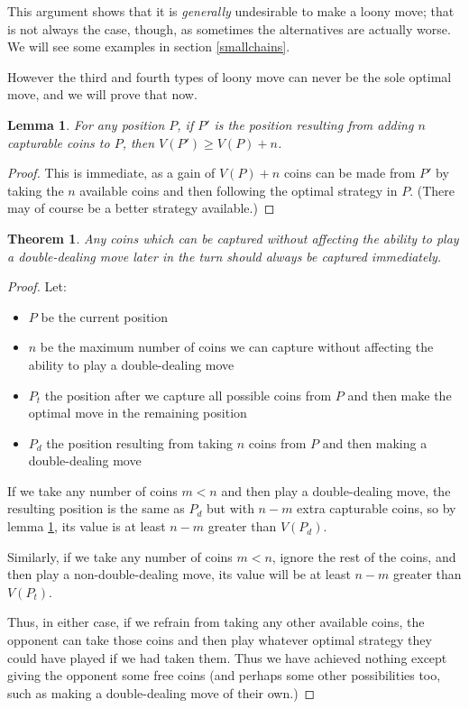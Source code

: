 \documentclass[a4paper,twocolumn]{article}
\newtheorem{addcoins}[thm]{Lemma}
\newtheorem{freecoins}[thm]{Theorem}
\begin{document}
This argument shows that it is \emph{generally} undesirable to make a
loony move; that is not always the case, though, as sometimes the
alternatives are actually worse. We will see some examples in section
\ref{smallchains}.

However the third and fourth types of loony move can never be the sole
optimal move, and we will prove that now.

\begin{addcoins}\label{addcoins}
  For any position $P$, if $P'$ is the position resulting from adding
  $n$ capturable coins to $P$, then $V(P') \ge V(P)+n$.
\end{addcoins}
\begin{proof}
  This is immediate, as a gain of $V(P)+n$ coins can be made from $P'$
  by taking the $n$ available coins and then following the optimal
  strategy in $P$. (There may of course be a better strategy
  available.)
\end{proof}

\begin{freecoins}\label{freecoins}
  Any coins which can be captured without affecting the ability to
  play a double-dealing move later in the turn should always be
  captured immediately.
\end{freecoins}
\begin{proof}
  Let:
  \begin{itemize}
    \item $P$ be the current position
    \item $n$ be the maximum number of coins we can capture without
      affecting the ability to play a double-dealing move
    \item $P_t$ the position after we capture all possible coins from
      $P$ and then make the optimal move in the remaining position
    \item $P_d$ the position resulting from taking $n$ coins from $P$
      and then making a double-dealing move
  \end{itemize}

  If we take any number of coins $m < n$ and then play a
  double-dealing move, the resulting position is the same as $P_d$ but
  with $n-m$ extra capturable coins, so by lemma \ref{addcoins}, its
  value is at least $n-m$ greater than $V(P_d)$.

  Similarly, if we take any number of coins $m < n$, ignore the rest
  of the coins, and then play a non-double-dealing move, its value
  will be at least $n-m$ greater than $V(P_t)$.

  Thus, in either case, if we refrain from taking any other available
  coins, the opponent can take those coins and then play whatever
  optimal strategy they could have played if we had taken them. Thus
  we have achieved nothing except giving the opponent some free coins
  (and perhaps some other possibilities too, such as making a
  double-dealing move of their own.)
\end{proof}
\end{document}
